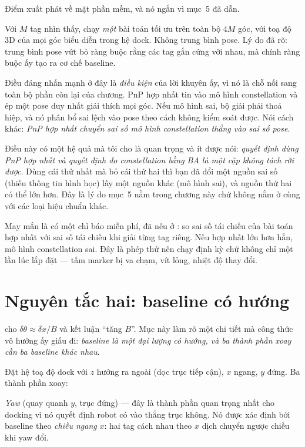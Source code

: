 \documentclass[../../marker.tex]{subfiles}
\begin{document}
Điểm xuất phát về mặt phần mềm, và nó ngắn vì  mục~5 đã dẫn.

Với \(M\) tag nhìn thấy, chạy \emph{một} bài toán tối ưu trên toàn bộ \(4M\) góc, với toạ độ 3D của mọi góc biểu diễn trong hệ dock. Không trung bình pose. Lý do đã rõ: trung bình pose vứt bỏ ràng buộc rằng các tag gắn cứng với nhau, mà chính ràng buộc ấy tạo ra cơ chế baseline.

Điều đáng nhấn mạnh ở đây là \emph{điều kiện} của lời khuyên ấy, vì nó là chỗ nối sang toàn bộ phần còn lại của chương. PnP hợp nhất tin vào mô hình constellation và ép một pose duy nhất giải thích mọi góc. Nếu mô hình sai, bộ giải phải thoả hiệp, và nó phân bổ sai lệch vào pose theo cách không kiểm soát được. Nói cách khác: \emph{PnP hợp nhất chuyển sai số mô hình constellation thẳng vào sai số pose}.

Điều này có một hệ quả mà tôi cho là quan trọng và ít được nói: \emph{quyết định dùng PnP hợp nhất và quyết định đo constellation bằng BA là một cặp không tách rời được}. Dùng cái thứ nhất mà bỏ cái thứ hai thì bạn đã đổi một nguồn sai số (thiếu thông tin hình học) lấy một nguồn khác (mô hình sai), và nguồn thứ hai có thể lớn hơn. Đây là lý do mục~5 nằm trong chương này chứ không nằm ở  cùng với các loại hiệu chuẩn khác.

May mắn là có một chỉ báo miễn phí, đã nêu ở : so sai số tái chiếu của bài toán hợp nhất với sai số tái chiếu khi giải từng tag riêng. Nếu hợp nhất lớn hơn hẳn, mô hình constellation sai. Đây là phép thử nên chạy định kỳ chứ không chỉ một lần lúc lắp đặt --- tấm marker bị va chạm, vít lỏng, nhiệt độ thay đổi.

\section{Nguyên tắc hai: baseline có hướng}

 cho \(\delta\theta \approx \delta x/B\) và kết luận ``tăng \(B\)''. Mục này làm rõ một chi tiết mà công thức vô hướng ấy giấu đi: \emph{baseline là một đại lượng có hướng, và ba thành phần xoay cần ba baseline khác nhau}.

Đặt hệ toạ độ dock với \(z\) hướng ra ngoài (dọc trục tiếp cận), \(x\) ngang, \(y\) đứng. Ba thành phần xoay:

\emph{Yaw} (quay quanh \(y\), trục đứng) --- đây là thành phần quan trọng nhất cho docking vì nó quyết định robot có vào thẳng trục không. Nó được xác định bởi baseline theo \emph{chiều ngang} \(x\): hai tag cách nhau theo \(x\) dịch chuyển ngược chiều khi yaw đổi.
\end{document}
